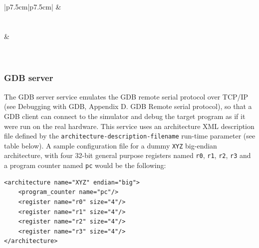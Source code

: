 \begin{center}
\begin{supertabular}{|p{7.5cm}|p{7.5cm}|}
		\hline
		 & \\
		\\
		\\
		\hline
		 & \\
		\\
		\\
		\hline
	\end{supertabular}
\end{center}

\newpage
\subsubsection{GDB server}
\label{tms320c3x_gdb_server}

The GDB server service emulates the GDB remote serial protocol over TCP/IP (see Debugging with GDB, Appendix D. GDB Remote serial protocol), so that a GDB client can connect to the simulator and debug the target program as if it were run on the real hardware.
This service uses an architecture XML description file defined by the \texttt{architecture-description-filename} run-time parameter (see table below).
A sample configuration file for a dummy \texttt{XYZ} big-endian architecture, with four 32-bit general purpose registers named \texttt{r0}, \texttt{r1}, \texttt{r2}, \texttt{r3} and a program counter named \texttt{pc} would be the following:
\begin{verbatim}
<architecture name="XYZ" endian="big">
    <program_counter name="pc"/>
    <register name="r0" size="4"/>
    <register name="r1" size="4"/>
    <register name="r2" size="4"/>
    <register name="r3" size="4"/>
</architecture>
\end{verbatim}

